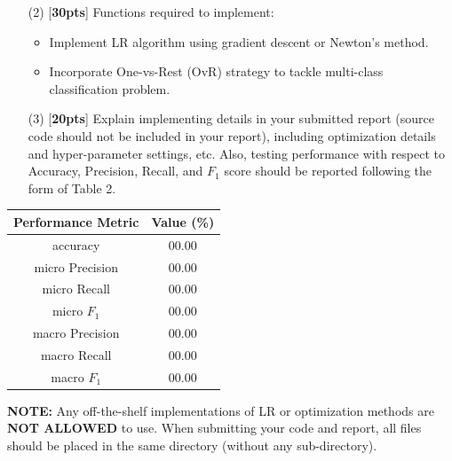 \begin{problem}
\begin{enumerate}
            \item[(2)] [\textbf{30pts}] Functions required to implement:
                \begin{itemize}
                    \item Implement LR algorithm using gradient descent or Newton's method.
                    \item Incorporate One-vs-Rest (OvR) strategy to tackle multi-class classification problem.
                \end{itemize}
            \item[(3)] [\textbf{20pts}] Explain implementing details in your submitted report (source code should not be included in your report), including optimization details and hyper-parameter settings, etc. Also, testing performance with respect to Accuracy, Precision, Recall, and $F_1$ score should be reported following the form of Table 2.
        \end{enumerate}

        \begin{Table}
            \centering
            \vspace{2mm}
            \label{tab:my_label}
            \begin{tabular}{|c|c|}
                \hline
                Performance Metric & Value (\%) \\
                \hline
                accuracy & 00.00 \\
                \hline
                micro Precision  & 00.00\\
                \hline
                micro Recall & 00.00\\
                \hline
                micro $F_1$ & 00.00\\
                \hline
                macro Precision  & 00.00\\
                \hline
                macro Recall & 00.00\\
                \hline
                macro $F_1$ & 00.00\\
                \hline
            \end{tabular}
        \end{Table}
        \textbf{NOTE:} Any off-the-shelf implementations of LR or optimization methods are \textbf{NOT ALLOWED} to use. When submitting your code and report, all files should be placed in the same directory (without any sub-directory).
    \end{problem}


